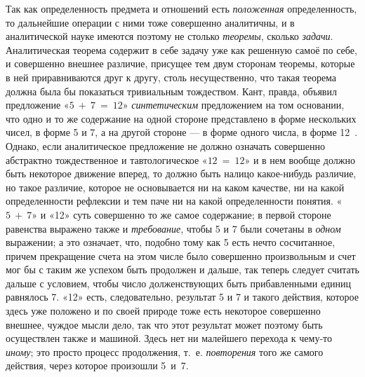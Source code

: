 \documentclass[twoside]{article}
\begin{document}
{Так как определенность предмета и отношений есть
{\em положенная}
определенность, то дальнейшие операции с ними тоже совершенно
аналитичны, и в аналитической науке имеются поэтому не столько
{\em теоремы}, сколько
{\em задачи}.
Аналитическая теорема содержит в себе задачу уже как решенную
самоё по себе, и совершенно внешнее различие, присущее тем двум сторонам
теоремы, которые в ней приравниваются друг к другу, столь несущественно,
что такая теорема должна была бы показаться тривиальным тождеством. Кант,
правда, объявил предложение «$5~+~7~=~12$»
{\em синтетическим}
предложением на том основании, что одно и то же содержание на
одной стороне представлено в форме нескольких чисел, в форме 5 и 7, а на 
другой стороне — в форме одного числа, в форме
12~\label{bkm:bm102}.
Однако, если аналитическое предложение не
должно означать совершенно абстрактно тождественное и тавтологическое
«$12~=~12$» и в нем вообще должно быть некоторое движение вперед, то должно
быть налицо какое-нибудь различие, но такое различие, которое не
основывается ни на каком качестве, ни на какой определенности рефлексии и
тем паче ни на какой определенности понятия. «$5~+~7$» и «12» суть совершенно
то же самое содержание; в первой стороне равенства выражено также и
{\em требование}, чтобы 5 и 7 были сочетаны в {\em одном}
выражении; а это означает, что, подобно тому как 5 есть нечто
сосчитанное, причем прекращение счета на этом числе было совершенно
произвольным и счет мог бы с таким же успехом быть продолжен и дальше, так
теперь следует считать дальше с условием, чтобы число долженствующих быть
прибавленными единиц равнялось 7. «12» есть, следовательно, результат 5 и 7
и такого действия, которое здесь уже положено и по своей природе тоже есть
некоторое совершенно внешнее, чуждое мысли дело, так что этот результат
может поэтому быть осуществлен также и машиной. Здесь нет ни малейшего
перехода к чему-то {\em иному};
это просто процесс продолжения, т.~е.
{\em повторения} того же
самого действия, через которое произошли 5~и~7.

}
\end{document}
